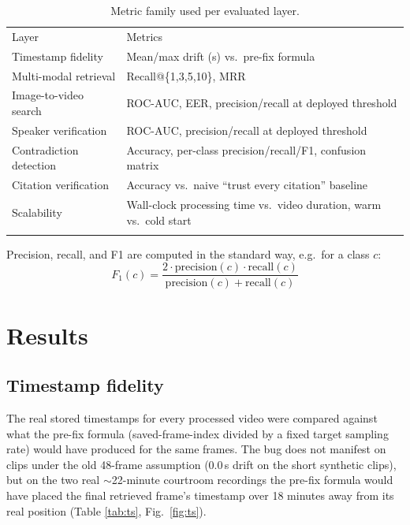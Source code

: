 \documentclass[3p,times,procedia]{elsarticle}
\begin{document}
\begin{table}[h]
\caption{Metric family used per evaluated layer.}
\label{tab:metrics}
\begin{tabular*}{\hsize}{@{\extracolsep{\fill}}ll@{}}
\toprule
Layer & Metrics \\
\colrule
Timestamp fidelity & Mean/max drift (s) vs.\ pre-fix formula \\
Multi-modal retrieval & Recall@\{1,3,5,10\}, MRR \\
Image-to-video search & ROC-AUC, EER, precision/recall at deployed threshold \\
Speaker verification & ROC-AUC, precision/recall at deployed threshold \\
Contradiction detection & Accuracy, per-class precision/recall/F1, confusion matrix \\
Citation verification & Accuracy vs.\ naive ``trust every citation'' baseline \\
Scalability & Wall-clock processing time vs.\ video duration, warm vs.\ cold start \\
\botrule
\end{tabular*}
\end{table}

Precision, recall, and F1 are computed in the standard way, e.g.\ for a class $c$:
\begin{equation}
F_1(c) = \frac{2 \cdot \text{precision}(c) \cdot \text{recall}(c)}{\text{precision}(c) + \text{recall}(c)}
\label{eq:f1}
\end{equation}

\section{Results}
\label{sec:results}

\subsection{Timestamp fidelity}

The real stored timestamps for every processed video were compared against what the
pre-fix formula (saved-frame-index divided by a fixed target sampling rate) would have
produced for the same frames. The bug does not manifest on clips under the old 48-frame
assumption (0.0\,s drift on the short synthetic clips), but on the two real
$\sim$22-minute courtroom recordings the pre-fix formula would have placed the final
retrieved frame's timestamp over 18 minutes away from its real position (Table
\ref{tab:ts}, Fig.~\ref{fig:ts}).
\end{document}

